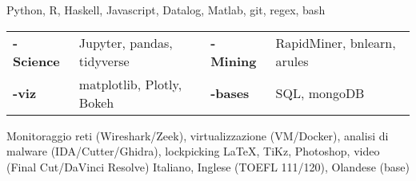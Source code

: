 
\begin{cvskills}
        {Python, R, Haskell, Javascript, Datalog, Matlab, git, regex, bash}
        {\begin{tabular}{llll}
            {\bf - Science} & Jupyter, pandas, tidyverse & {\bf - Mining} &RapidMiner, bnlearn, arules \\
            {\bf-viz} & matplotlib, Plotly, Bokeh    & {\bf-bases} & SQL, mongoDB
        \end{tabular}}
        {Monitoraggio reti (Wireshark/Zeek), virtualizzazione (VM/Docker), analisi di malware (IDA/Cutter/Ghidra), lockpicking}
        {\LaTeX, TiKz, Photoshop, video (Final Cut/DaVinci Resolve)}
        {Italiano, Inglese (TOEFL 111/120), Olandese (base)}
\end{cvskills}
